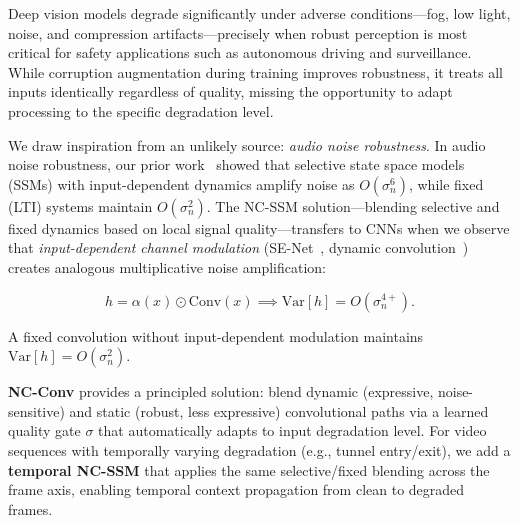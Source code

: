 \documentclass[10pt,twocolumn,letterpaper]{article}
\begin{document}
Deep vision models degrade significantly under adverse conditions---fog, low light, noise, and compression artifacts---precisely when robust perception is most critical for safety applications such as autonomous driving and surveillance.
While corruption augmentation during training improves robustness, it treats all inputs identically regardless of quality, missing the opportunity to adapt processing to the specific degradation level.

We draw inspiration from an unlikely source: \emph{audio noise robustness}.
In audio noise robustness, our prior work~\cite{choi2026ncssm} showed that selective state space models (SSMs) with input-dependent dynamics amplify noise as $O(\sigma_n^6)$, while fixed (LTI) systems maintain $O(\sigma_n^2)$.
The NC-SSM solution---blending selective and fixed dynamics based on local signal quality---transfers to CNNs when we observe that \emph{input-dependent channel modulation} (SE-Net~\cite{hu2018squeeze}, dynamic convolution~\cite{chen2020dynamic}) creates analogous multiplicative noise amplification:

\vspace{-2mm}
\begin{equation}
h = \alpha(x) \odot \text{Conv}(x) \implies \text{Var}[h] = O(\sigma_n^{4+}).
\end{equation}
\vspace{-2mm}

A fixed convolution without input-dependent modulation maintains $\text{Var}[h] = O(\sigma_n^2)$.

\textbf{NC-Conv} provides a principled solution: blend dynamic (expressive, noise-sensitive) and static (robust, less expressive) convolutional paths via a learned quality gate $\sigma$ that automatically adapts to input degradation level.
For video sequences with temporally varying degradation (e.g., tunnel entry/exit), we add a \textbf{temporal NC-SSM} that applies the same selective/fixed blending across the frame axis, enabling temporal context propagation from clean to degraded frames.
\end{document}
